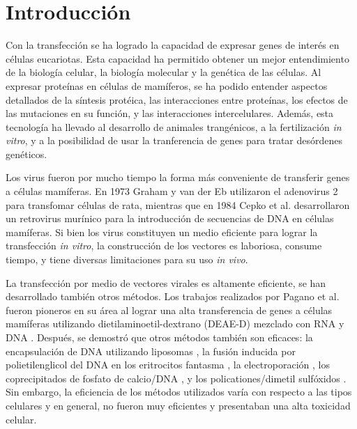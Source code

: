 \documentclass[fleqn,10pt]{SelfArx} %
\affiliation{\textsuperscript{1}\textit{Facultad de Ciencias Biológicas, Universidad Ricardo Palma, Lima, Peru}} %
\affiliation{*\textbf{Correspondencia}: jmanuel9112@icloud.com / giancuneo@gmail.com } %
\begin{document}
\flushbottom %

\maketitle %

\tableofcontents %

\thispagestyle{empty} %


\section{Introducción} 

Con la transfección se ha logrado la capacidad de expresar genes de interés en células eucariotas. Esta capacidad ha permitido obtener un mejor entendimiento de la biología celular, la biología molecular y la genética de las células. Al expresar proteínas en células de mamíferos, se ha podido entender aspectos detallados de la síntesis protéica, las interacciones entre proteínas, los efectos de las mutaciones en su función, y las interacciones intercelulares. Además, esta tecnología ha llevado al desarrollo de animales trangénicos, a la fertilización \textit{in vitro}, y a la posibilidad de usar la tranferencia de genes para tratar desórdenes genéticos.

Los virus fueron por mucho tiempo la forma más conveniente de transferir genes a células mamíferas. En 1973 Graham y van der Eb \cite{Graham:1973aa} utilizaron el adenovirus 2 para transfomar células de rata, mientras que en 1984 Cepko et al. \cite{Cepko:1984aa} desarrollaron un retrovirus murínico para la introducción de secuencias de DNA en células mamíferas. Si bien los virus constituyen un medio eficiente para lograr la transfección \textit{in vitro}, la construcción de los vectores es laboriosa, consume tiempo, y tiene diversas limitaciones para su uso \textit{in vivo}.

La transfección por medio de vectores virales es altamente eficiente, se han desarrollado también otros métodos. Los trabajos realizados por Pagano et al. fueron pioneros en su área al lograr una alta transferencia de genes a células mamíferas utilizando dietilaminoetil-dextrano (DEAE-D) mezclado con RNA y DNA  \cite{McCutchan:1968aa, Pagano:1967aa}. Después, se demostró que otros métodos también son eficaces: la encapsulación de DNA utilizando liposomas \cite{Fraley:1980aa, Wong:1980aa, Straubinger:1983aa, Fraley:1981aa}, la fusión inducida por polietilenglicol del DNA en los eritrocitos fantasma \cite{Straus:1980aa}, la electroporación \cite{Neumann:1982aa}, los coprecipitados de fosfato de calcio/DNA \cite{Wigler:1979aa}, y los policationes/dimetil sulfóxidos \cite{Kawai:1984aa}. Sin embargo, la eficiencia de los métodos utilizados varía con respecto a las tipos celulares y en general, no fueron muy eficientes y presentaban una alta toxicidad celular.
\end{document}

